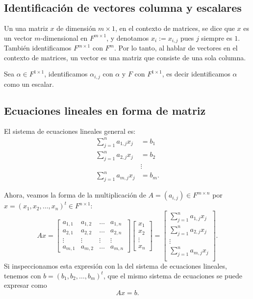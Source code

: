 \documentclass{article}
\begin{document}
\subsection{Identificación de vectores columna y escalares}
Un una matriz $x$ de dimensión $m\times 1$, en el contexto de matrices, se dice que $x$ es un vector $m$-dimensional en $F^{m\times 1}$, y denotamos $x_i := x_{i,j}$
pues $j$ siempre es $1$. También identificamos
$F^{m\times 1}$ con ${F}^m$. Por lo tanto,
al hablar de vectores en el contexto de matrices, un vector
es una matriz que consiste de una sola columna.

Sea $\alpha\in F^{1\times 1}$, identificamos $\alpha_{i,j}$ con
$\alpha$ y $F$ con $F^{1\times 1}$, es decir identificamos $\alpha$
como un escalar.

\subsection{Ecuaciones lineales en forma de matriz}
El sistema de ecuaciones lineales general es:
\begin{align*}
    \sum^n_{j=1}a_{1,j} x_j &= b_1 \\
    \sum^n_{j=1}a_{2,j} x_j &= b_2 \\
    &\vdots \\
    \sum^n_{j=1}a_{m,j} x_j &= b_m.
\end{align*}

Ahora, veamos la forma de la multiplicación de $A=(a_{i,j})\in F^{m\times n}$
por $x=(x_1, x_2, \ldots, x_n)^t \in F^{n\times 1}$:
$$Ax = 
\begin{bmatrix}
    a_{1,1} & a_{1,2} & \ldots & a_{1, n} \\
    a_{2,1} & a_{2,2} & \ldots & a_{2, n} \\
    \vdots & \vdots & \vdots & \vdots \\
    a_{m,1} & a_{m,2} & \ldots & a_{m, n}
\end{bmatrix}
\begin{bmatrix}
    x_1 \\
    x_2 \\
    \vdots \\
    x_n
\end{bmatrix}
=
\begin{bmatrix}
    \sum^n_{j=1} a_{1,j} x_j \\ 
    \sum^n_{j=1} a_{2,j} x_j \\
    \vdots \\
    \sum^n_{j=1} a_{m,j} x_j \\ 
\end{bmatrix}.$$
Si inspeccionamos esta expresión con la del sistema de ecuaciones lineales, tenemos con $b=(b_1, b_2, \ldots, b_m)^t$, que el mismo sistema de ecuaciones se puede expresar como
$$Ax = b.$$
\end{document}
